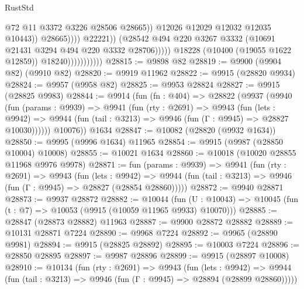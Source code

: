 \begin{lexlean}{RustStd}
\begin{coremodule}
{\begin{coremodule}
{{{{{{{{{{{{{{{{{{{{{{{{{                                                    @72
                                                    @11
                                                    @3372
                                                    @3226
                                                    @28506
                                                    @28665))
                                                @12026
                                                @12029
                                                @12032
                                                @12035
                                                @10443))
                                            @28665))))
                                    @22221))
                                (@28542
                                  @494
                                  @220
                                  @3267
                                  @3332
                                  (@10691 @21431 @3294 @494 @220 @3332 @28706)))))
                          @18228
                          (@10400 (@19055 @1622 @12859))
                          @18240)))))))))))
@28815 := @9898 @82
@28819 := @9900 (@9904 @82) (@9910 @82)
@28820 := @9919 @11962
@28822 := @9915 (@28820 @9934)
@28824 := @9957 (@9958 @82)
@28825 := @9953 @28824
@28827 := @9915 (@28825 @9983)
@28844 := @9914
    (fun (fn : @404) =>
    @28822
      (@9937
        (@9940
          (fun (params : @9939) =>
          @9941
            (fun (rty : @2691) =>
            @9943
              (fun (lets : @9942) =>
              @9944 (fun (tail : @3213) => @9946 (fun (Γ : @9945) => @28827 @10030))))))
        @10076))
    @1634
@28847 := @10082 (@28820 (@9932 @1634))
@28850 := @9995 (@9996 @1634) @11965
@28854 := @9915 (@9987 (@28850 @10004) @10008)
@28855 := @10021 @1634
@28860 := @10018 (@10020 @28855 @11968 @9976 @9978)
@28871 := fun (params : @9939) =>
  @9941
    (fun (rty : @2691) =>
    @9943
      (fun (lets : @9942) =>
      @9944 (fun (tail : @3213) => @9946 (fun (Γ : @9945) => @28827 (@28854 @28860)))))
@28872 := @9940 @28871
@28873 := @9937 @28872
@28882 := @10044
    (fun (U : @10043) => @10045 (fun (t : @7) => @10053 (@9915 (@10059 @11965 @9933) @10070)))
@28885 := @28847 (@28873 @28882) @11963
@28887 := @9900 @28872 @28882
@28889 := @10131 @28871 @7224
@28890 := @9968 @7224
@28892 := @9965 (@28890 @9981)
@28894 := @9915 (@28825 @28892)
@28895 := @10003 @7224
@28896 := @28850 @28895
@28897 := @9987 @28896
@28899 := @9915 (@28897 @10008)
@28910 := @10134
    (fun (rty : @2691) =>
    @9943
      (fun (lets : @9942) =>
      @9944 (fun (tail : @3213) => @9946 (fun (Γ : @9945) => @28894 (@28899 @28860)))))
}}}}}}}}}}}}}}}}}}}}}}}}}
\end{coremodule}}
\end{coremodule}
\end{lexlean}
